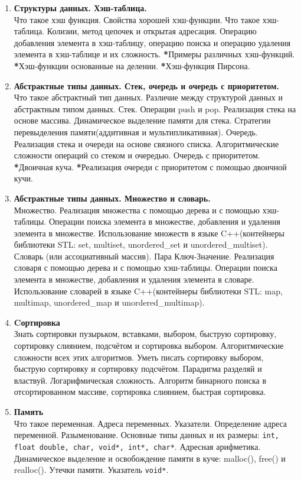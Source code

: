 \documentclass{article}
\begin{document}
\begin{enumerate}
\item \textbf{Структуры данных. Хэш-таблица.}\\
Что такое хэш функция. Свойства хорошей хэш-функции. Что такое хэш-таблица. Колизии, метод цепочек и открытая адресация. Операцию добавления элемента в хэш-таблицу, операцию поиска и операцию удаления элемента в хэш-таблице и их сложность. \textbf{*}Примеры различных хэш-функций. \textbf{*}Хэш-функции основанные на делении. \textbf{*}Хэш-функция Пирсона.

\item  \textbf{Абстрактные типы данных. Стек, очередь и очередь с приоритетом.}\\
Что такое абстрактный тип данных.
Различие между структурой данных и абстрактным типом данных. Стек. Операции push и pop. Реализация стека на основе массива. Динамическое выделение памяти для стека. Стратегии перевыделения памяти(аддитивная и мультипликативная).  Очередь. Реализация стека и очереди на основе связного списка. Алгоритмические сложности операций со стеком и очередью. Очередь с приоритетом. \textbf{*}Двоичная куча. \textbf{*}Реализация очереди с приоритетом с помощью двоичной кучи.

\item  \textbf{Абстрактные типы данных. Множество и словарь.}\\
Множество. Реализация множества с помощью дерева и с помощью хэш-таблицы. Операции поиска элемента в множестве, добавления и удаления элемента в множестве. Использование множеств в языке C++(контейнеры библиотеки STL: set, multiset, unordered\_set и unordered\_multiset). \\
Словарь (или ассоциативный массив). Пара Ключ-Значение. Реализация словаря с помощью дерева и с помощью хэш-таблицы. Операции поиска элемента в множестве, добавления и удаления элемента в словаре. Использование словарей в языке C++(контейнеры библиотеки STL: map, multimap, unordered\_map и unordered\_multimap).

\item \textbf{Cортировка}\\
Знать сортировки пузырьком, вставками, выбором, быструю сортировку, сортировку слиянием, подсчётом и сортировка выбором. Алгоритмические сложности всех этих алгоритмов. Уметь писать сортировку выбором, быструю сортировку и сортировку подсчётом. Парадигма разделяй и властвуй. Логарифмическая сложность. Алгоритм бинарного поиска в отсортированном массиве, сортировка слиянием, быстрая сортировка.

\item \textbf{Память}\\
Что такое переменная. Адреса переменных. Указатели. Определение адреса переменной. Разыменование. Основные типы данных и их размеры: \texttt{int, float double, char, void*, int*, char*}. Адресная арифметика. Динамическое выделение и освобождение памяти в куче: malloc(), free() и realloc(). Утечки памяти. Указатель \texttt{void*}.


\end{enumerate}
\end{document}
